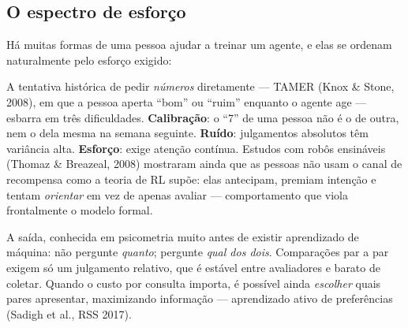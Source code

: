 \documentclass[11pt, a4paper]{article}
\begin{document}
\subsection{O espectro de esforço}

Há muitas formas de uma pessoa ajudar a treinar um agente, e elas se ordenam
naturalmente pelo esforço exigido:

\begin{center}
\end{center}

A tentativa histórica de pedir \emph{números} diretamente --- TAMER (Knox \&
Stone, 2008), em que a pessoa aperta ``bom'' ou ``ruim'' enquanto o agente age
--- esbarra em três dificuldades. \textbf{Calibração}: o ``7'' de uma pessoa não
é o de outra, nem o dela mesma na semana seguinte. \textbf{Ruído}: julgamentos
absolutos têm variância alta. \textbf{Esforço}: exige atenção contínua. Estudos
com robôs ensináveis (Thomaz \& Breazeal, 2008) mostraram ainda que as pessoas
não usam o canal de recompensa como a teoria de RL supõe: elas antecipam, premiam
intenção e tentam \emph{orientar} em vez de apenas avaliar --- comportamento que
viola frontalmente o modelo formal.

A saída, conhecida em psicometria muito antes de existir aprendizado de máquina:
não pergunte \emph{quanto}; pergunte \emph{qual dos dois}. Comparações par a par
exigem só um julgamento relativo, que é estável entre avaliadores e barato de
coletar. Quando o custo por consulta importa, é possível ainda \emph{escolher}
quais pares apresentar, maximizando informação --- aprendizado ativo de
preferências (Sadigh et al., RSS 2017).
\end{document}
